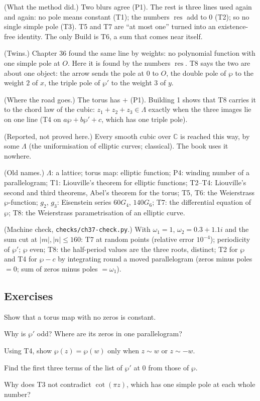 \begin{lines}
\item[\lab{R1}] (What the method did.) Two blurs agree (P1). The rest is three lines used again and again: no pole means constant (T1); the numbers $\operatorname{res}$ add to $0$ (T2); so no single simple pole (T3). T5 and T7 are ``at most one'' turned into an existence-free identity. The only Build is T6, a sum that comes near itself.
\item[\lab{R2}] (Twins.) Chapter 36 found the same line by weights: no polynomial function with one simple pole at $O$. Here it is found by the numbers $\operatorname{res}$. T8 says the two are about one object: the arrow sends the pole at $0$ to $O$, the double pole of $\wp$ to the weight $2$ of $x$, the triple pole of $\wp'$ to the weight $3$ of $y$.
\item[\lab{R3}] (Where the road goes.) The torus has $+$ (P1). Building 1 shows that T8 carries it to the chord law of the cubic: $z_1 + z_2 + z_3 \in \Lambda$ exactly when the three images lie on one line (T4 on $a\wp + b\wp' + c$, which has one triple pole).
\item[\lab{R4}] (Reported, not proved here.) Every smooth cubic over $\mathbb{C}$ is reached this way, by some $\Lambda$ (the uniformisation of elliptic curves; classical). The book uses it nowhere.
\item[\lab{R5}] (Old names.) $\Lambda$: a lattice; torus map: elliptic function; P4: winding number of a parallelogram; T1: Liouville's theorem for elliptic functions; T2--T4: Liouville's second and third theorems, Abel's theorem for the torus; T5, T6: the Weierstrass $\wp$-function; $g_2$, $g_3$: Eisenstein series $60 G_4$, $140 G_6$; T7: the differential equation of $\wp$; T8: the Weierstrass parametrisation of an elliptic curve.
\item[\lab{R6}] (Machine check, \texttt{checks/ch37-check.py}.) With $\omega_1 = 1$, $\omega_2 = 0.3 + 1.1i$ and the sum cut at $|m|, |n| \le 160$: T7 at random points (relative error $10^{-4}$); periodicity of $\wp'$; $\wp$ even; T8: the half-period values are the three roots, distinct; T2 for $\wp$ and T4 for $\wp - c$ by integrating round a moved parallelogram (zeros minus poles $= 0$; sum of zeros minus poles $= \omega_1$).
\end{lines}

\subsection*{Exercises}

\begin{lines}
\item[\lab{E1}] Show that a torus map with no zeros is constant.
\item[\lab{E2}] Why is $\wp'$ odd? Where are its zeros in one parallelogram?
\item[\lab{E3}] Using T4, show $\wp(z) = \wp(w)$ only when $z \sim w$ or $z \sim -w$.
\item[\lab{E4}] Find the first three terms of the list of $\wp'$ at $0$ from those of $\wp$.
\item[\lab{E5}] Why does T3 not contradict $\cot(\pi z)$, which has one simple pole at each whole number?
\end{lines}
